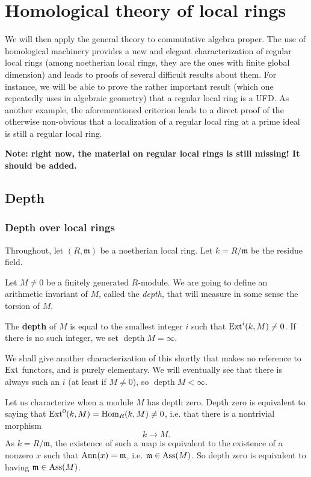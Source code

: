 \chapter{Homological theory of local rings}

We will then apply the general theory to commutative algebra proper. The use
of homological machinery provides a new and elegant characterization of regular local
rings (among noetherian local rings, they are the ones with finite global
dimension) and leads to proofs of several difficult results about them.
For instance, we will be able to prove the rather important result (which one
repeatedly uses in algebraic geometry) that a
regular local ring is a UFD.
As another example, the aforementioned criterion leads to a direct proof of
the otherwise non-obvious that a localization of a regular local ring at a
prime ideal is still a regular local ring.

\textbf{Note: right now, the material on regular local rings is still missing!
It should be added.}

\section{Depth}


\subsection{Depth over local rings}

Throughout, let $(R, \mathfrak{m})$ be  a noetherian
local ring. Let $k = R/\mathfrak{m}$ be the residue field. 

Let $M \neq 0$ be a finitely generated $R$-module. We are going to define an
arithmetic invariant of $M$, called the \emph{depth}, that will measure in
some sense the torsion of $M$.

\newcommand{\depth}{\operatorname{depth}}
\begin{definition}
The \textbf{depth} of $M$ is equal to the smallest integer $i$
such that
$\operatorname{Ext}^i(k,M) \neq 0$. If there is no such integer, we set $\depth M = \infty$.
\end{definition}

We shall give another characterization of this shortly that makes no reference
to $\operatorname{Ext}$ functors, and is purely elementary.
We will eventually see that there is always such an $i$ (at least if $M \neq
0$), so $\depth M < \infty$.

\begin{example} Let us characterize when a module $M$ has depth zero. 
Depth zero is equivalent to saying that $\operatorname{Ext}^0(k,M) = \operatorname{Hom}_R(k, M) \neq 0$,
i.e. that there is a
nontrivial morphism
\[ k \to M.  \]
As $k = R/\mathfrak{m}$, the existence of such a map is
equivalent to the existence of a nonzero $x$
such that $\operatorname{Ann}(x) = \mathfrak{m}$, i.e. $\mathfrak{m} \in
\operatorname{Ass}(M)$. So depth
zero is equivalent to having $\mathfrak{m} \in \operatorname{Ass}(M)$.
\end{example}

